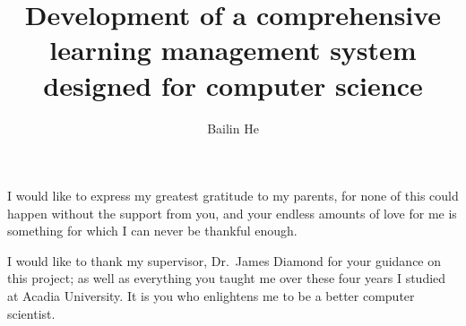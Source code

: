 

\title{Development of a comprehensive learning management system designed for
computer science}

\author{Bailin He}







\firstThreePages


\Acknowledgments
I would like to express my greatest gratitude to my parents,
for none of this could happen without the
support from you, and your endless amounts of love for me is something for which
I can never be thankful enough.

\medskip

I would like to thank my supervisor, Dr.~James Diamond for your
guidance on this project; as well as everything you taught me over these four
years I studied at Acadia University.
It is you who enlightens me to be a better computer scientist.

